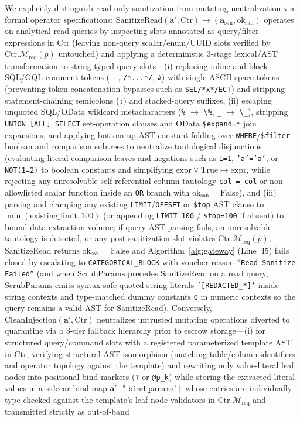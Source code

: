 \documentclass[conference,10pt]{IEEEtran}
\begin{document}
We explicitly distinguish read-only sanitization from mutating neutralization via formal operator specifications: $\text{SanitizeRead}(\mathbf{a}', \text{Ctr}) \to (\mathbf{a}_{\text{san}}, \text{ok}_{\text{san}})$ operates on analytical read queries by inspecting slots annotated as query/filter expressions in $\text{Ctr}$ (leaving non-query scalar/enum/UUID slots verified by $\text{Ctr}.\mathcal{M}_{\text{req}}(p)$ untouched) and applying a deterministic 3-stage lexical/AST transformation to string-typed query slots---(i) replacing inline and block SQL/GQL comment tokens (\texttt{-{}-}, \texttt{/*...*/}, \texttt{\#}) with single ASCII space tokens (preventing token-concatenation bypasses such as \texttt{SEL/*x*/ECT}) and stripping statement-chaining semicolons (\texttt{;}) and stacked-query suffixes, (ii) escaping unquoted SQL/OData wildcard metacharacters (\texttt{\%} $\to$ \texttt{\textbackslash\%}, \texttt{\_} $\to$ \texttt{\textbackslash\_}), stripping \texttt{UNION [ALL] SELECT} set-operation clauses and OData \texttt{\$expand=*} join expansions, and applying bottom-up AST constant-folding over \texttt{WHERE}/\texttt{\$filter} boolean and comparison subtrees to neutralize tautological disjunctions (evaluating literal comparison leaves and negations such as \texttt{1=1}, \texttt{'a'='a'}, or \texttt{NOT(1=2)} to boolean constants and simplifying $\text{expr} \lor \text{True} \mapsto \text{expr}$, while rejecting any unresolvable self-referential column tautology \texttt{col = col} or non-allowlisted scalar function inside an \texttt{OR} branch with $\text{ok}_{\text{san}} = \text{False}$), and (iii) parsing and clamping any existing \texttt{LIMIT}/\texttt{OFFSET} or \texttt{\$top} AST clause to $\min(\text{existing\_limit}, 100)$ (or appending \texttt{LIMIT 100} / \texttt{\$top=100} if absent) to bound data-extraction volume; if query AST parsing fails, an unresolvable tautology is detected, or any post-sanitization slot violates $\text{Ctr}.\mathcal{M}_{\text{req}}(p)$, $\text{SanitizeRead}$ returns $\text{ok}_{\text{san}} = \text{False}$ and Algorithm~\ref{alg:gateway} (Line~45) fails closed by escalating to \texttt{CATEGORICAL\_BLOCK} with voucher reason \texttt{``Read Sanitize Failed''} (and when $\text{ScrubParams}$ precedes $\text{SanitizeRead}$ on a read query, $\text{ScrubParams}$ emits syntax-safe quoted string literals \texttt{'[REDACTED\_*]'} inside string contexts and type-matched dummy constants \texttt{0} in numeric contexts so the query remains a valid AST for $\text{SanitizeRead}$). Conversely, $\text{CleanInjection}(\mathbf{a}', \text{Ctr})$ neutralizes untrusted mutating operations diverted to quarantine via a 3-tier fallback hierarchy prior to escrow storage---(i) for structured query/command slots with a registered parameterized template AST in $\text{Ctr}$, verifying structural AST isomorphism (matching table/column identifiers and operator topology against the template) and rewriting only value-literal leaf nodes into positional bind markers (\texttt{?} or \texttt{@p\_k}) while storing the extracted literal values in a sidecar bind map $\mathbf{a}'[\texttt{"\_bind\_params"}]$ whose entries are individually type-checked against the template's leaf-node validators in $\text{Ctr}.\mathcal{M}_{\text{req}}$ and transmitted strictly as out-of-band 
\end{document}
